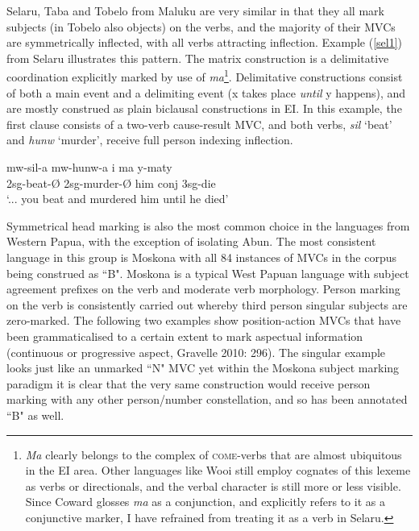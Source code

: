 Selaru, Taba and Tobelo from Maluku are very similar in that they all mark subjects (in Tobelo also objects) on the verbs, and the majority of their MVCs are symmetrically inflected, with all verbs attracting inflection. Example (\ref{sel1}) from Selaru illustrates this pattern. The matrix construction is a delimitative coordination explicitly marked by use of \textit{ma}\footnote{\textit{Ma} clearly belongs to the complex of \textsc{come}-verbs that are almost ubiquitous in the EI area. Other languages like Wooi still employ cognates of this lexeme as verbs or directionals, and the verbal character is still more or less visible. Since Coward glosses \textit{ma} as a conjunction, and explicitly refers to it as a conjunctive marker, I have refrained from treating it as a verb in Selaru.}. Delimitative constructions consist of both a main event and a delimiting event (x takes place \textit{until} y happens), and are mostly construed as plain biclausal constructions in EI. In this example, the first clause consists of a two-verb cause-result MVC, and both verbs, \textit{sil} `beat' and \textit{hunw} `murder', receive full person indexing inflection.

\ea \label{sel1}
\gll mw-sil-a mw-hunw-a i ma y-maty \\
2\acs{sg}-beat-Ø 2\acs{sg}-murder-Ø him \acs{conj} 3\acs{sg}-die \\
\glft `... you beat and murdered him until he died' \\ 
\z
\xe

Symmetrical head marking is also the most common choice in the languages from Western Papua, with the exception of isolating Abun.  The most consistent language in this group is Moskona with all 84 instances of MVCs in the corpus being construed as ``B". Moskona is a typical West Papuan language with subject agreement prefixes on the verb and moderate verb morphology. Person marking on the verb is consistently carried out whereby third person singular subjects are zero-marked. The following two examples show position-action MVCs that have been grammaticalised to a certain extent to mark aspectual information (continuous or progressive aspect, Gravelle 2010: 296). The singular example looks just like an unmarked ``N" MVC yet within the Moskona subject marking paradigm it is clear that the very same construction would receive person marking with any other person/number constellation, and so has been annotated ``B" as well.

